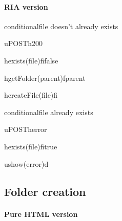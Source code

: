 \documentclass[a4paper, dvipsnames]{article}
\begin{document}
	\pagebreak
	
	\paragraph{RIA version}
	
	\begin{center}
		\begin{sequencediagram}
			
			\begin{sdblock}{conditional}{file doesn't already exists}
				\begin{call}{u}{POST}{h}{200}
					\begin{call}{h}{exists(file)}{fi}{false}
					\end{call}
					\begin{call}{h}{getFolder(parent)}{f}{parent}
					\end{call}
					\begin{call}{h}{createFile(file)}{fi}{}
					\end{call}
				\end{call}
			\end{sdblock}
			\begin{sdblock}{conditional}{file already exists}
				\begin{call}{u}{POST}{h}{error}
					\begin{call}{h}{exists(file)}{fi}{true}
					\end{call}
				\end{call}
				\begin{call}{u}{show(error)}{d}{}
				\end{call}
			\end{sdblock}
		\end{sequencediagram}
	\end{center}
	
	\pagebreak
	
	\subsection{Folder creation}
	
	\paragraph{Pure HTML version}
	
\end{document}

